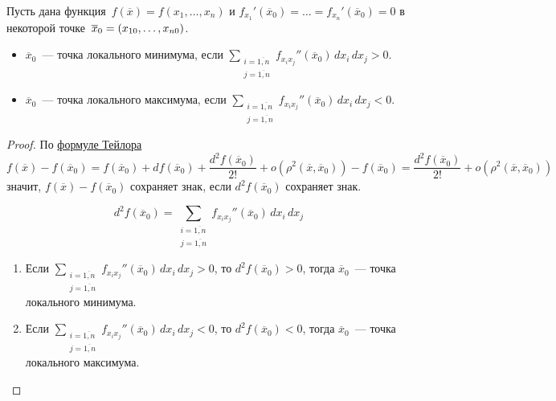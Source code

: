 \begin{theorem}
\label{th:sufficient_condition_of_local_extremum}
Пусть дана функция~$f(\overline x) = f(x_1, \ldots, x_n)$ и $f_{x_1}'(\overline x_0) = \ldots = f_{x_n}'(\overline x_0) = 0$ в некоторой точке~$\overline x_0 \opbr= (x_{10}, \ldots, x_{n0})$.
\begin{itemize}
	\item $\overline x_0$~--- точка локального минимума, если $\sum\limits_{
	\begin{smallmatrix}
	i = \overline{1, n} \\
	j = \overline{1, n}
	\end{smallmatrix}
	} f_{x_i x_j}''(\overline x_0)\,dx_i\,dx_j > 0$.
	\item $\overline x_0$~--- точка локального максимума, если $\sum\limits_{
	\begin{smallmatrix}
	i = \overline{1, n} \\
	j = \overline{1, n}
	\end{smallmatrix}
	} f_{x_i x_j}''(\overline x_0)\,dx_i\,dx_j < 0$.
\end{itemize}
\end{theorem}
\begin{proof}
По \hyperref[eq:Taylor_series_for_several_variables]{формуле Тейлора}
\begin{equation*}
f(\overline x) - f(\overline x_0) =
f(\overline x_0) + df(\overline x_0) + \frac{d^2 f(\overline x_0)}{2!} + o(\rho^2(\overline x, \overline x_0)) - f(\overline x_0) =
\frac{d^2 f(\overline x_0)}{2!} + o(\rho^2(\overline x, \overline x_0))
\end{equation*}
значит, $f(\overline x) - f(\overline x_0)$ сохраняет знак, если $d^2 f(\overline x_0)$ сохраняет знак.
	
\begin{equation*}
d^2 f(\overline x_0) = \sum_{
\begin{smallmatrix}
i = \overline{1, n} \\
j = \overline{1, n}
\end{smallmatrix}
} f_{x_i x_j}''(\overline x_0)\,dx_i\,dx_j
\end{equation*}
	
\begin{enumerate}
	\item Если $\displaystyle \sum_{
	\begin{smallmatrix}
	i = \overline{1, n} \\
	j = \overline{1, n}
	\end{smallmatrix}
	} f_{x_i x_j}''(\overline x_0)\,dx_i\,dx_j > 0$, то	$d^2 f(\overline x_0) > 0$, тогда $\overline x_0$~--- точка локального минимума.
	\item Если $\displaystyle \sum_{
	\begin{smallmatrix}
	i = \overline{1, n} \\
	j = \overline{1, n}
	\end{smallmatrix}
	} f_{x_i x_j}''(\overline x_0)\,dx_i\,dx_j < 0$, то	$d^2 f(\overline x_0) < 0$, тогда $\overline x_0$~--- точка локального максимума.
\end{enumerate}
\end{proof}
	
